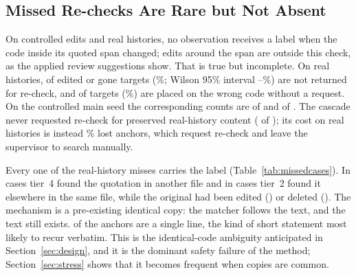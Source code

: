 \begin{table}[t]
\begin{tabular}{@{}l rrrrrr c rrrrrr@{}}
\end{tabular}
\end{table}

\subsection{Missed Re-checks Are Rare but Not Absent}
On controlled edits and real histories, no observation receives a  label when the code inside its quoted span changed; edits around the span are outside this check, as the applied review suggestions show. That is true but incomplete. On real histories, \smRealCasMissK{} of \smRealCasMissN{} edited or gone targets (\smRealCasMissPct\%; Wilson 95\% interval \smRealCasMissLo--\smRealCasMissHi\%) are not returned for re-check, and \smRealCasSilentK{} of \smRealCasSilentN{} targets (\smRealCasSilentPct\%) are placed on the wrong code without a request. On the controlled main seed the corresponding counts are \smCtlCasMissK{} of \smCtlCasMissN{} and \smCtlCasSilentK{} of \smCtlCasSilentN{}. The cascade never requested re-check for preserved real-history content (\smRealCasFalseK{} of \smRealCasFalseN{}); its cost on real histories is instead \smRealCasLostPct\% lost anchors, which request re-check and leave the supervisor to search manually.

Every one of the \smRealCasMissK{} real-history misses carries the  label (Table~\ref{tab:missedcases}). In \wpaMissCross{} cases tier~4 found the quotation in another file and in \wpaMissSame{} cases tier~2 found it elsewhere in the same file, while the original had been edited (\wpaMissEdited{}) or deleted (\wpaMissGone{}). The mechanism is a pre-existing identical copy: the matcher follows the text, and the text still exists. \wpaMissSingleLine{} of the \wpaMissTotal{} anchors are a single line, the kind of short statement most likely to recur verbatim. This is the identical-code ambiguity anticipated in Section~\ref{sec:design}, and it is the dominant safety failure of the method; Section~\ref{sec:stress} shows that it becomes frequent when copies are common.

